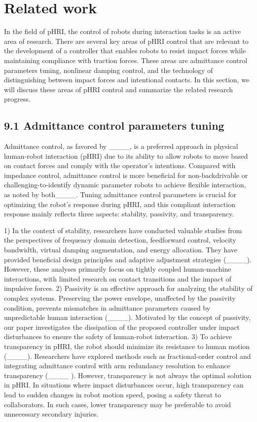 \section{Related work}
In the field of pHRI, the control of robots during interaction tasks is an active area of research. There are several key areas of pHRI control that are relevant to the development of a controller that enables robots to resist impact forces while maintaining compliance with traction forces. These areas are admittance control parameters tuning, nonlinear damping control, and the technology of distinguishing between impact forces and intentional contacts.
In this section, we will discuss these areas of pHRI control and summarize the related research progress.

\subsection{9.1 Admittance control parameters tuning}
Admittance control, as favored by ____, is a preferred approach in physical human-robot interaction (pHRI) due to its ability to allow robots to move based on contact forces and comply with the operator's intentions. 
Compared with impedance control, admittance control is more beneficial for non-backdrivable or challenging-to-identify dynamic parameter robots to achieve flexible interaction, as noted by both____.  Tuning admittance control parameters is crucial for optimizing the robot's response during pHRI, and this compliant interaction response mainly reflects three aspects: stability, passivity, and transparency.

1) In the context of stability, researchers have conducted valuable studies from the perspectives of frequency domain detection, feedforward control, velocity bandwidth, virtual damping augmentation, and energy allocation. They have provided beneficial design principles and adaptive adjustment strategies (____). However, these analyses primarily focus on tightly coupled human-machine interactions, with limited research on contact transitions and the impact of impulsive forces. 2) Passivity is an effective approach for analyzing the stability of complex systems. Preserving the power envelope, unaffected by the passivity condition, prevents mismatches in admittance parameters caused by unpredictable human interaction (____). Motivated by the concept of passivity, our paper investigates the dissipation of the proposed controller under impact disturbances to ensure the safety of human-robot interaction. 3) To achieve transparency in pHRI, the robot should minimize its resistance to human motion (____). Researchers have explored methods such as fractional-order control and integrating admittance control with arm redundancy resolution to enhance transparency (____ ). However, transparency is not always the optimal solution in pHRI. In situations where impact disturbances occur, high transparency can lead to sudden changes in robot motion speed, posing a safety threat to collaborators. In such cases, lower transparency may be preferable to avoid unnecessary secondary injuries. 

